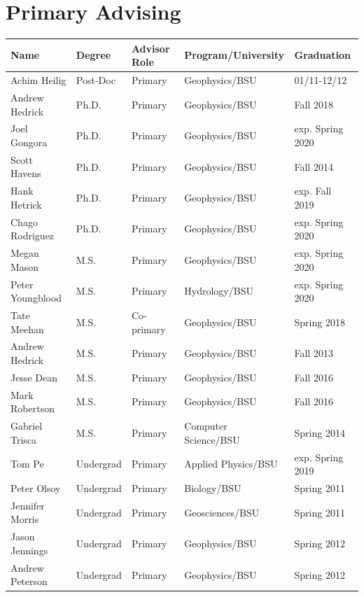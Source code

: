 \documentclass[11pt]{article}
\renewcommand\arraystretch{1}
\begin{document}
\pagebreak

\section*{Primary Advising}
\begin{table}[!htbp]
\renewcommand\arraystretch{0.7}
  \centering
  \begin{tabular}{|l|l|l|l|l|}
\hline
\textbf{Name} & \textbf{Degree} & \textbf{Advisor Role} & \textbf{Program/University} & \textbf{Graduation} \\ \hline \hline
Achim Heilig & Post-Doc & Primary & Geophysics/BSU & 01/11-12/12 \\ \hline
Andrew Hedrick & Ph.D. & Primary & Geophysics/BSU & Fall 2018 \\ \hline
Joel Gongora & Ph.D. & Primary & Geophysics/BSU & exp. Spring 2020 \\ \hline
Scott Havens & Ph.D. & Primary & Geophysics/BSU & Fall 2014 \\ \hline
Hank Hetrick & Ph.D. & Primary & Geophysics/BSU & exp. Fall 2019 \\ \hline
Chago Rodriguez & Ph.D. & Primary & Geophysics/BSU & exp. Spring 2020 \\ \hline
Megan Mason & M.S. & Primary & Geophysics/BSU & exp. Spring 2020 \\ \hline
Peter Youngblood & M.S. & Primary & Hydrology/BSU & exp. Spring 2020 \\ \hline
Tate Meehan & M.S. & Co-primary & Geophysics/BSU & Spring 2018 \\ \hline
Andrew Hedrick & M.S. & Primary & Geophysics/BSU & Fall 2013 \\ \hline
Jesse Dean & M.S. & Primary & Geophysics/BSU & Fall 2016 \\ \hline
Mark Robertson & M.S. & Primary & Geophysics/BSU & Fall 2016 \\ \hline
Gabriel Trisca & M.S. & Primary & Computer Science/BSU & Spring 2014 \\ \hline
Tom Pe & Undergrad & Primary & Applied Physics/BSU & exp. Spring 2019 \\ \hline
Peter Olsoy & Undergrad & Primary & Biology/BSU & Spring 2011 \\ \hline
Jennifer Morris & Undergrad & Primary & Geosciences/BSU & Spring 2011 \\ \hline
Jason Jennings & Undergrad & Primary & Geophysics/BSU & Spring 2012 \\ \hline
Andrew Peterson & Undergrad & Primary & Geophysics/BSU & Spring 2012 \\ \hline

\end{tabular}
\end{table}
\end{document}
